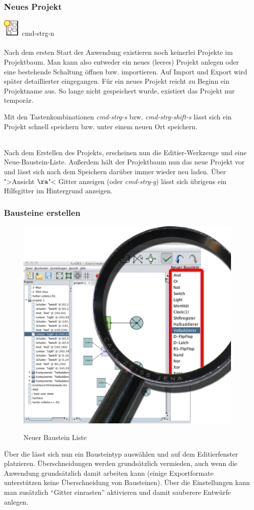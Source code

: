\documentclass[12pt,a4paper]{scrartcl}
\newcommand{\fckNewBrickList}{Neue-Baustein-Liste\xspace}
\begin{document}
\subsubsection{Neues Projekt}
{\Large \hspace{0.5em} \includegraphics[height=2ex]{images/newProject.png} \hspace{0.5em}\textbullet \hspace{0.5em} \gls{cmd-strg-n} } \\ \\
Nach dem ersten Start der Anwendung existieren noch keinerlei Projekte im Projektbaum. Man kann also entweder ein neues (leeres) Projekt anlegen oder eine bestehende Schaltung öffnen bzw. importieren. Auf Import und Export wird später detaillierter eingegangen. Für ein neues Projekt reicht zu Beginn ein Projektname aus. So lange nicht gespeichert wurde, existiert das Projekt nur temporär.
\begin{info}
	Mit den Tastenkombinationen \textit{\gls{cmd-strg-s}} bzw. \textit{\gls{cmd-strg-shift-s}} lässt sich ein Projekt schnell speichern bzw. unter einem neuen Ort speichern.
\end{info} \\
Nach dem Erstellen des Projekts, erscheinen nun die Editier-Werkzeuge und eine \fckNewBrickList. Außerdem hält der Projektbaum nun das neue Projekt vor und lässt sich nach dem Speichern darüber immer wieder neu laden. Über ">Ansicht $\ra$"< Gitter anzeigen (oder \textit{\gls{cmd-strg-g}}) lässt sich übrigens ein Hilfsgitter im Hintergrund anzeigen.
\subsubsection{Bausteine erstellen}
		\begin{figure}[H]
			\centering
			\includegraphics[width=0.5\linewidth]{images/NeuerBausteinListe.jpg}
			\label{fig:new-brick-list}
			\caption{Neuer Baustein Liste}
		\end{figure}
Über die lässt sich nun ein Bausteintyp auswählen und auf dem Editierfenster platzieren. Überschneidungen werden grundsätzlich vermieden, auch wenn die Anwendung grundsätzlich damit arbeiten kann (einige Exportformate unterstützen keine Überschneidung von Bausteinen). Über die Einstellungen kann man zusätzlich ``Gitter einrasten'' aktivieren und damit sauberere Entwürfe anlegen.
\end{document}
